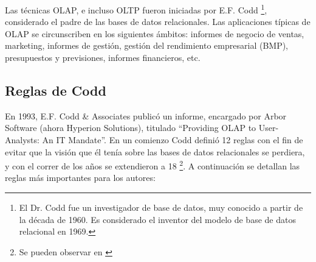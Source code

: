 \documentclass[a4paper,11pt]{article}
\begin{document}
    Las técnicas OLAP, e incluso OLTP fueron iniciadas por E.F. Codd \footnote{El Dr. Codd fue un investigador de base de datos, muy conocido a partir de la
    década de 1960. Es considerado el inventor del modelo de base de datos relacional en 1969.}, considerado el padre de las bases de datos
    relacionales. Las aplicaciones típicas de OLAP se circunscriben en los siguientes ámbitos: informes de negocio de ventas, marketing, informes de gestión,
    gestión del rendimiento empresarial (BMP), presupuestos y previsiones, informes financieros, etc.
    
    
    \subsection{Reglas de Codd}
    
    En 1993, E.F. Codd \& Associates publicó un informe, encargado por Arbor Software (ahora Hyperion Solutions), titulado ``Providing OLAP to User-Analysts:
    An IT Mandate''.
    En un comienzo Codd definió 12 reglas con el fin de evitar que la visión que él tenía sobre las bases de datos relacionales se perdiera, y con el correr
    de los años se extendieron a 18 \footnote{Se pueden observar en \cite[p.~205]{nagabhushana}}. A continuación se detallan las reglas más importantes 
    para los autores:
    
\end{document}
